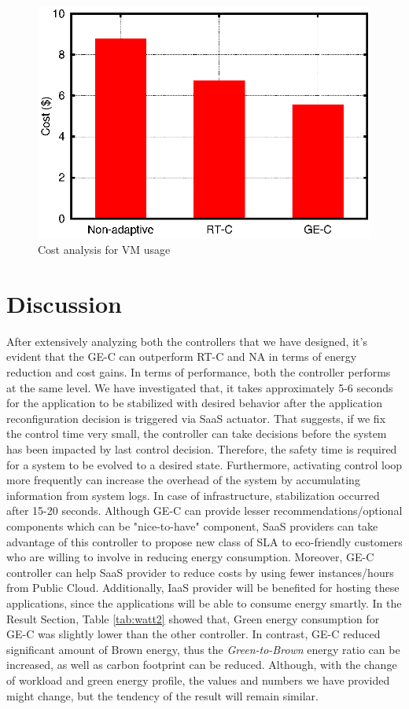 \begin{figure} [htb]
\centering
\includegraphics[scale=.7]{Graphs/cost.eps}
\caption{Cost analysis for VM usage}
\label{fig:cost}
\end{figure}

\section{Discussion}

After extensively analyzing both the controllers that we have
designed, it’s evident that the GE-C can outperform
RT-C and NA in terms of energy reduction
and cost gains. In terms of performance, both the controller performs at the same level. We have investigated that, it takes approximately
5-6 seconds for the application to be stabilized
with desired behavior after the application reconfiguration decision is
triggered via SaaS actuator. That suggests, if we fix the control time very
small, the controller can take decisions before the system has
been impacted by last control decision. Therefore, the safety
time is required for a system to be evolved to a desired
state. Furthermore, activating control loop more frequently
can increase the overhead of the system by accumulating
information from system logs. In case of infrastructure, stabilization occurred after 15-20 seconds. 
Although GE-C can provide lesser recommendations/optional components which can be "nice-to-have" component,
SaaS providers can take advantage of
this controller to propose new class of SLA to eco-friendly
customers who are willing to involve in reducing energy consumption. Moreover, GE-C controller can help SaaS provider to reduce costs by using fewer instances/hours from Public Cloud. Additionally, IaaS provider will be benefited for hosting these applications, since the applications will be able to consume energy smartly. In the Result Section, Table \ref{tab:watt2} showed that, Green energy consumption for GE-C was slightly lower than the other controller. In contrast, GE-C reduced significant amount of Brown energy, thus the \emph{Green-to-Brown} energy ratio can be increased, as well as carbon footprint can be reduced. Although, with the change of workload and green energy profile, the values and numbers we have provided might change, but the tendency of the result will remain similar.


